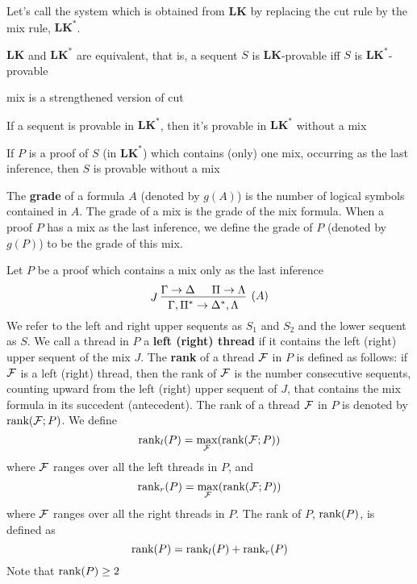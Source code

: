 \documentclass[11pt]{article}
\def \LK {\textbf{LK}}
\def \LKs {\textbf{LK}^*}
\begin{document}
Let's call the system which is obtained from \(\LK\) by replacing the cut
rule by the mix rule, \(\LKs\).

\begin{lemma}[]
\(\LK\) and \(\LKs\) are equivalent, that is, a sequent \(S\) is
\(\LK\)-provable iff \(S\) is \(\LKs\)-provable
\end{lemma}

mix is a strengthened version of cut

\begin{theorem}[]
If a sequent is provable in \(\LKs\), then it's provable in \(\LKs\) without
a mix
\end{theorem}

\begin{lemma}[]
If \(P\) is a proof of \(S\) (in \(\LKs\)) which contains (only) one mix,
occurring as the last inference, then \(S\) is provable without a mix
\end{lemma}

The \textbf{grade} of a formula \(A\) (denoted by \(g(A)\)) is the number of logical
symbols contained in \(A\). The grade of a mix is the grade of the mix
formula. When a proof \(P\) has a mix as the last inference, we define the
grade of \(P\) (denoted by \(g(P)\)) to be the grade of this mix.

Let \(P\) be a proof which contains  a mix only as the last inference
\begin{equation*}
J\;\begin{prooftree}%
\hypo{\Gamma\to\Delta}
\hypo{\Pi \to \Lambda}
\infer2[\((A)\)]{\Gamma,\Pi^* \to \Delta^*,\Lambda}
\end{prooftree}
\end{equation*}
We refer to the left and right upper sequents as \(S_1\) and \(S_2\) and 
the lower sequent as \(S\). We call a thread in \(P\) a \textbf{left (right) thread}
if it contains the left (right) upper sequent of the mix \(J\). The \textbf{rank} of a
thread \(\mathcal{F}\) in \(P\) is defined as follows: if \(\mathcal{F}\) is a left
(right) thread, then the rank of \(\mathcal{F}\) is the number consecutive
sequents, counting upward from the left (right) upper sequent of \(J\), that
contains the mix formula in its succedent (antecedent). The rank of a thread
\(\mathcal{F}\) in \(P\) is denoted by \(\text{rank}(\mathcal{F};P)\). We define
\begin{equation*}
\text{rank}_l(P)=\max_{\mathcal{F}}(\text{rank}(\mathcal{F};P))
\end{equation*}
where \(\mathcal{F}\) ranges over all the left threads in \(P\), and
\begin{equation*}
\text{rank}_r(P)=\max_{\mathcal{F}}(\text{rank}(\mathcal{F};P))
\end{equation*}
where \(\mathcal{F}\) ranges over all the right threads in \(P\). The rank of
\(P\), \(\text{rank}(P)\), is defined as
\begin{equation*}
\text{rank}(P)=\text{rank}_l(P)+\text{rank}_r(P)
\end{equation*}
Note that \(\text{rank}(P)\ge 2\)
\end{document}
